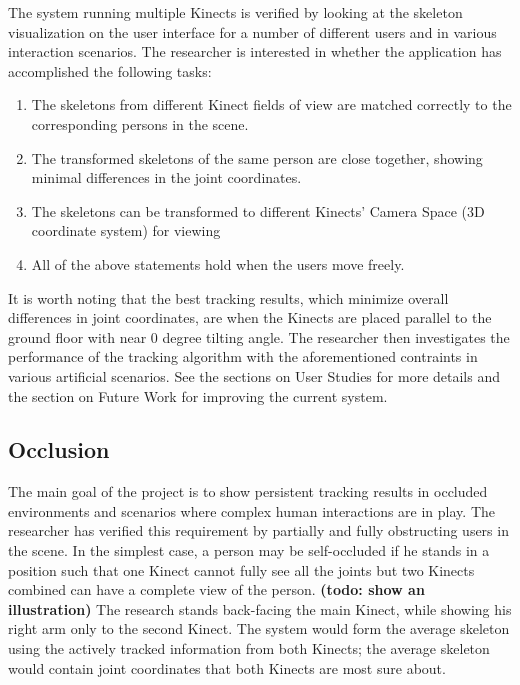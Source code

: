 \documentclass{sigchi}
\begin{document}
The system running multiple Kinects is verified by looking at the skeleton visualization on the user interface for a number of different users and in various interaction scenarios. The researcher is interested in whether the application has accomplished the following tasks:

\begin{enumerate}
  \item The skeletons from different Kinect fields of view are matched correctly to the corresponding persons in the scene.
  \item The transformed skeletons of the same person are close together, showing minimal differences in the joint coordinates.
  \item The skeletons can be transformed to different Kinects' Camera Space (3D coordinate system) for viewing
  \item All of the above statements hold when the users move freely.
\end{enumerate}

It is worth noting that the best tracking results, which minimize overall differences in joint coordinates, are when the Kinects are placed parallel to the ground floor with near 0 degree tilting angle. The researcher then investigates the performance of the tracking algorithm with the aforementioned contraints in various artificial scenarios. See the sections on User Studies for more details and the section on Future Work for improving the current system.

\subsection{Occlusion}

The main goal of the project is to show persistent tracking results in occluded environments and scenarios where complex human interactions are in play. The researcher has verified this requirement by partially and fully obstructing users in the scene. In the simplest case, a person may be self-occluded if he stands in a position such that one Kinect cannot fully see all the joints but two Kinects combined can have a complete view of the person. \textbf{(todo: show an illustration)} The research stands back-facing the main Kinect, while showing his right arm only to the second Kinect. The system would form the average skeleton using the actively tracked information from both Kinects; the average skeleton would contain joint coordinates that both Kinects are most sure about.
\end{document}

